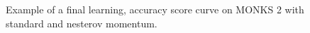 \begin{appendices}
             \begin{figure}[H]
                \centering
                \begin{subfigure}{0.40\textwidth}
                    \caption{}
                    \label{fig:monks_2_MSE_SGD}
                \end{subfigure}
                \begin{subfigure}{0.40\textwidth}
                    \caption{}
                    \label{fig:monks_2_ACC_SGD}
                \end{subfigure}
                \caption{Example of a final learning, accuracy score curve on MONKS 2 with standard and nesterov momentum.}
                \label{fig:monks_2_SGD}
            \end{figure}


\end{appendices}
